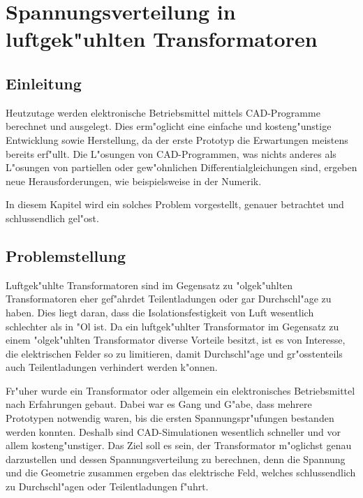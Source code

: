 \chapter{Spannungsverteilung in luftgek"uhlten Transformatoren\label{chapter:thema}}
\begin{refsection}

\section{Einleitung}

Heutzutage werden elektronische Betriebsmittel mittels CAD-Programme berechnet und ausgelegt. Dies erm"oglicht eine einfache und kosteng"unstige Entwicklung sowie Herstellung, da der erste Prototyp die Erwartungen meistens bereits erf"ullt. Die L"osungen von CAD-Programmen, was nichts anderes als L"osungen von partiellen oder gew"ohnlichen Differentialgleichungen sind, ergeben neue Herausforderungen, wie beispielsweise in der Numerik. 

In diesem Kapitel wird ein solches Problem vorgestellt, genauer betrachtet und schlussendlich gel"ost.

\section{Problemstellung}

Luftgek"uhlte Transformatoren sind im Gegensatz zu "olgek"uhlten Transformatoren eher gef"ahrdet Teilentladungen oder gar Durchschl"age zu haben. Dies liegt daran, dass die Isolationsfestigkeit von Luft wesentlich schlechter als in "Ol ist. Da ein luftgek"uhlter Transformator im Gegensatz zu einem "olgek"uhlten Transformator diverse Vorteile besitzt, ist es von Interesse, die elektrischen Felder so zu limitieren, damit Durchschl"age und gr"osstenteils auch Teilentladungen verhindert werden k"onnen. 

Fr"uher wurde ein Transformator oder allgemein ein elektronisches Betriebsmittel nach Erfahrungen gebaut. Dabei war es Gang und G"abe, dass mehrere Prototypen notwendig waren, bis die ersten Spannungspr"ufungen bestanden werden konnten. Deshalb sind CAD-Simulationen wesentlich schneller und vor allem kosteng"unstiger. Das Ziel soll es sein, der Transformator m"oglichst genau darzustellen und dessen Spannungsverteilung zu berechnen, denn die Spannung und die Geometrie zusammen ergeben das elektrische Feld, welches schlussendlich zu Durchschl"agen oder Teilentladungen f"uhrt.


\end{refsection}
